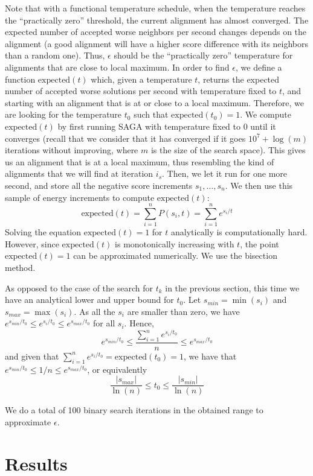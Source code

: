 \documentclass[]{article}
\begin{document}
Note that with a functional temperature schedule, when the temperature reaches the ``practically zero'' threshold, the current alignment has almost converged. The expected number of accepted worse neighbors per second changes depends on the alignment (a good alignment will have a higher score difference with its neighbors than a random one). Thus, $\epsilon$ should be the ``practically zero'' temperature for alignments that are close to local maximum. In order to find $\epsilon$, we define a function $\mbox{expected}(t)$ which, given a temperature $t$, returns the expected number of accepted worse solutions per second with temperature fixed to $t$, and starting with an alignment that is at or close to a local maximum. Therefore, we are looking for the temperature $t_0$ such that $\mbox{expected}(t_0)=1$. We compute $\mbox{expected}(t)$ by first running SAGA with temperature fixed to 0 until it converges (recall that we consider that it has converged if it goes $10^7+\log(m)$ iterations without improving, where $m$ is the size of the search space). This gives us an alignment that is at a local maximum, thus resembling the kind of alignments that we will find at iteration $i_s$. Then, we let it run for one more second, and store all the negative score increments $s_1, \ldots, s_n$. We then use this sample of energy increments to compute $\mbox{expected}(t)$:
$$\mbox{expected}(t)=\sum_{i=1}^n P(s_i, t)=\sum_{i=1}^n e^{s_i/t}$$
Solving the equation $\mbox{expected}(t)=1$ for $t$ analytically is computationally hard. However, since $\mbox{expected}(t)$ is monotonically increasing with $t$, the point $\mbox{expected}(t)=1$ can be approximated numerically. We use the bisection method.

As opposed to the case of the search for $t_k$ in the previous section, this time we have an analytical lower and upper bound for $t_0$. Let $s_{min}=\min(s_i)$ and $s_{max}=\max(s_i)$. As all the $s_i$ are smaller than zero, we have $e^{s_{min}/t_0}\le e^{s_i/t_0}\le e^{s_{max}/t_0}$ for all $s_i$. Hence,
$$e^{s_{min}/t_0} \le \dfrac{\sum_{i=1}^n e^{s_i/t_0}}{n}\le e^{s_{max}/t_0}$$
and given that $\sum_{i=1}^n e^{s_i/t_0}=\mbox{expected}(t_0)=1$, we have that $e^{s_{min}/t_0}\le 1/n\le e^{s_{max}/t_0}$, or equivalently
$$\frac{|s_{max}|}{\ln(n)} \le t_0 \le \frac{|s_{min}|}{\ln(n)}$$

We do a total of 100 binary search iterations in the obtained range to approximate $\epsilon$.

\section{Results}
\end{document}
